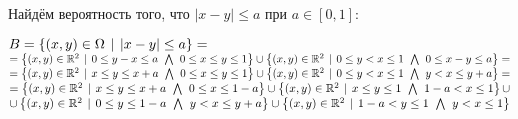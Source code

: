 \documentclass{article}
\begin{document}
	Найдём вероятность того, что $|x-y| \leq a$ при $a \in [0, 1]$:
	\begin{center}
		$B = \left\lbrace(x, y) \in \Omega \hspace{4px}|\hspace{4px} |x-y| \leq a \right\rbrace
		=$\\$= \left\lbrace(x, y) \in \mathbb{R}^2 \hspace{4px}|\hspace{4px} 0\leq y-x \leq a \hspace{4px}\bigwedge\hspace{4px} 0\leq x \leq y \leq 1 \right\rbrace 
		\cup 
		\left\lbrace(x, y) \in \mathbb{R}^2 \hspace{4px}|\hspace{4px} 0 \leq y < x \leq 1 \hspace{4px}\bigwedge\hspace{4px} 0 \leq x-y \leq a \right\rbrace =$ \\ $
		= \left\lbrace(x, y) \in \mathbb{R}^2 \hspace{4px}|\hspace{4px} x \leq y \leq x+a \hspace{4px}\bigwedge\hspace{4px} 0 \leq x \leq y\leq 1 \right\rbrace 
		\cup 
		\left\lbrace(x, y) \in \mathbb{R}^2 \hspace{4px}|\hspace{4px} 0 \leq y < x \leq 1 \hspace{4px}\bigwedge\hspace{4px} y < x \leq y+a \right\rbrace =$ \\ 
		
		$= \left\lbrace(x, y) \in \mathbb{R}^2 \hspace{4px}|\hspace{4px} x \leq y \leq x+a \hspace{4px}\bigwedge\hspace{4px} 0 \leq x \leq 1 - a \right\rbrace 
		\cup \left\lbrace(x, y) \in \mathbb{R}^2 \hspace{4px}|\hspace{4px} x \leq y \leq 1 \hspace{4px}\bigwedge\hspace{4px} 1-a < x \leq 1 \right\rbrace 
		\cup $\\$ \cup 
		\left\lbrace(x, y) \in \mathbb{R}^2 \hspace{4px}|\hspace{4px} 0 \leq y \leq 1 - a \hspace{4px}\bigwedge\hspace{4px} y < x \leq y+a \right\rbrace 
		\cup 
		\left\lbrace(x, y) \in \mathbb{R}^2 \hspace{4px}|\hspace{4px} 1-a < y \leq 1 \hspace{4px}\bigwedge\hspace{4px} y < x \leq 1 \right\rbrace$
		\vspace{10px}
		

\end{center}
\end{document}
